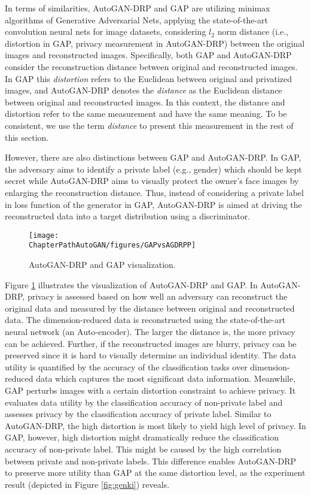 In terms of similarities, AutoGAN-DRP and GAP are utilizing minimax algorithms of Generative Adversarial Nets, applying the state-of-the-art convolution neural nets for image datasets, considering $l_2$ norm distance (i.e., distortion in GAP, privacy measurement in AutoGAN-DRP) between the original images and reconstructed images. Specifically, both GAP and AutoGAN-DRP consider the reconstruction distance between original and reconstructed images. In GAP this \textit{distortion} refers to the Euclidean between original and privatized images, and AutoGAN-DRP denotes the \textit{distance} as the Euclidean distance between original and reconstructed images. In this context, the distance and distortion refer to the same measurement and have the same meaning. To be consistent, we use the term \textit{distance} to present this measurement in the rest of this section.

However, there are also distinctions between GAP and AutoGAN-DRP. In GAP, the adversary aims to identify a private label (e.g., gender) which should be kept secret while AutoGAN-DRP aims to visually protect the owner's face images by enlarging the reconstruction distance. Thus, instead of considering a private label in loss function of the generator in GAP, AutoGAN-DRP is aimed at driving the reconstructed data into a target distribution using a discriminator.   
   
\begin{figure}
	\texttt{[image: \\ChapterPathAutoGAN/figures/GAPvsAGDRPP]}
	\caption{AutoGAN-DRP and GAP visualization.}
	\label{fig:AGDRPPvsGAP}
\end{figure}
      
Figure \ref{fig:AGDRPPvsGAP} illustrates the visualization of AutoGAN-DRP and GAP. In AutoGAN-DRP, privacy is assessed based on how well an adversary can reconstruct the original data and measured by the distance between original and reconstructed data. The dimension-reduced data is reconstructed using the state-of-the-art neural network (an Auto-encoder). The larger the distance is, the more privacy can be achieved. Further, if the reconstructed images are blurry, privacy can be preserved since it is hard to visually determine an individual identity. The data utility is quantified by the accuracy of the classification tasks over dimension-reduced data which captures the most significant data information. Meanwhile, GAP perturbs images with a certain distortion constraint to achieve privacy. It evaluates data utility by the classification accuracy of non-private label and assesses privacy by the classification accuracy of private label. Similar to AutoGAN-DRP, the high distortion is most likely to yield high level of privacy. In GAP, however, high distortion might dramatically reduce the classification accuracy of non-private label. This might be caused by the high correlation between private and non-private labels. This difference enables AutoGAN-DRP to preserve more utility than GAP at the same distortion level, as the experiment result (depicted in Figure \ref{fig:genki}) reveals. 

